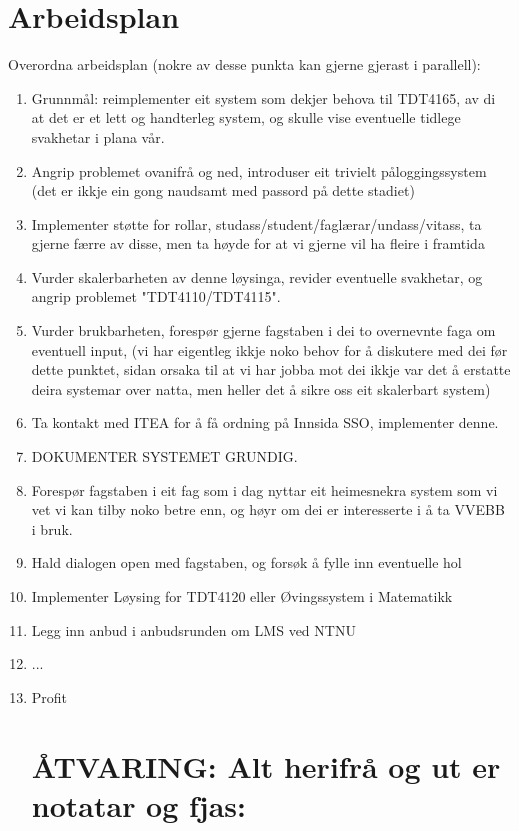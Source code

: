 \documentclass[12pt]{article}
\begin{document}
  \section{Arbeidsplan}
  Overordna arbeidsplan (nokre av desse punkta kan gjerne gjerast i parallell):
  \begin{enumerate}
  \item Grunnmål: reimplementer eit system som dekjer behova til TDT4165, av di at det er et lett og handterleg system, og skulle vise eventuelle tidlege svakhetar i plana vår.
  \item Angrip problemet ovanifrå og ned, introduser eit trivielt påloggingssystem (det er ikkje ein gong naudsamt med passord på dette stadiet)
  \item Implementer støtte for rollar, studass/student/faglærar/undass/vitass, ta gjerne færre av disse, men ta høyde for at vi gjerne vil ha fleire i framtida
  \item Vurder skalerbarheten av denne løysinga, revider eventuelle svakhetar, og angrip problemet "TDT4110/TDT4115".
  \item Vurder brukbarheten, forespør gjerne fagstaben i dei to overnevnte faga om eventuell input, (vi har eigentleg ikkje noko behov for å diskutere med dei før dette punktet, sidan orsaka til at vi har jobba mot dei ikkje var det å erstatte deira systemar over natta, men heller det å sikre oss eit skalerbart system)
  \item Ta kontakt med ITEA for å få ordning på Innsida SSO, implementer denne.
  \item DOKUMENTER SYSTEMET GRUNDIG.
  \item Forespør fagstaben i eit fag som i dag nyttar eit heimesnekra system som vi vet vi kan tilby noko betre enn, og høyr om dei er interesserte i å ta VVEBB i bruk.
  \item Hald dialogen open med fagstaben, og forsøk å fylle inn eventuelle hol
  \item Implementer Løysing for TDT4120 eller Øvingssystem i Matematikk
  \item Legg inn anbud i anbudsrunden om LMS ved NTNU
  \item ...
  \item Profit  
  
  \section{ÅTVARING: Alt herifrå og ut er notatar og fjas:}
  

\end{enumerate}
\end{document}

